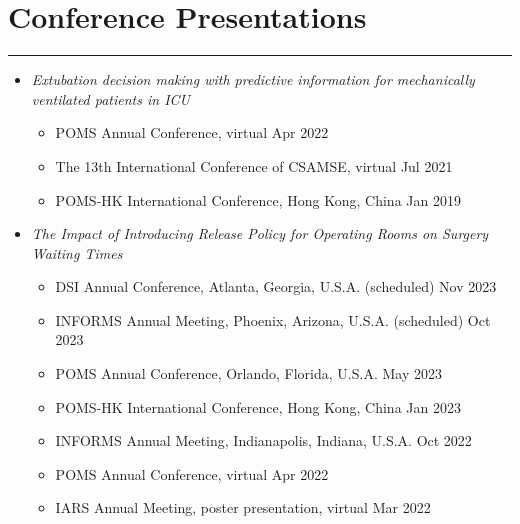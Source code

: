 \documentclass[12pt, a4paper]{article}
\begin{document}
{\begin{enumerate}[leftmargin=28pt, itemsep=6pt, parsep=0.2pt, topsep=1pt]
\end{enumerate}




\section*{Conference Presentations}
\vspace*{0.4em}
\hrule height 0.5pt
\begin{itemize}[leftmargin=26pt, itemsep=8pt, parsep=0.2pt, topsep=1pt]

	\item {\it Extubation decision making with predictive information for mechanically ventilated patients in ICU}
	\begin{itemize}[leftmargin=14pt, itemsep=4pt, topsep=2pt]
		\item POMS Annual Conference, virtual \hfill Apr 2022
		\item The 13th International Conference of CSAMSE, virtual \hfill Jul 2021
		\item POMS-HK International Conference, Hong Kong, China \hfill Jan 2019
	\end{itemize}

	\item {\it The Impact of Introducing Release Policy for Operating Rooms on Surgery Waiting Times}
	\begin{itemize}[leftmargin=14pt, itemsep=2pt, topsep=2pt]
		\item DSI Annual Conference, Atlanta, Georgia, U.S.A. (scheduled) \hfill Nov 2023
		\item INFORMS Annual Meeting, Phoenix, Arizona, U.S.A. (scheduled) \hfill Oct 2023
		\item POMS Annual Conference, Orlando, Florida, U.S.A. \hfill May 2023
		\item POMS-HK International Conference, Hong Kong, China \hfill Jan 2023
		\item INFORMS Annual Meeting, Indianapolis, Indiana, U.S.A. \hfill Oct 2022
		\item POMS Annual Conference, virtual \hfill Apr 2022
		\item IARS Annual Meeting, poster presentation, virtual \hfill Mar 2022
	\end{itemize}


\end{itemize}}
\end{document}
